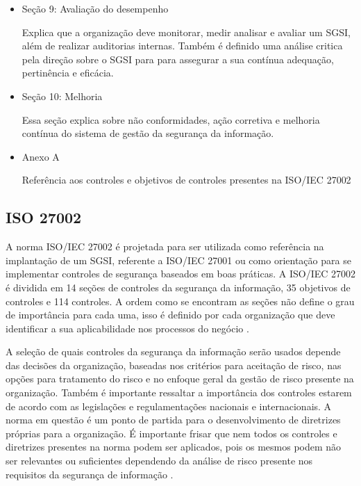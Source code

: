 \begin{itemize}
\item Seção 9: Avaliação do desempenho

    Explica que a organização deve monitorar, medir analisar e avaliar um SGSI, além de realizar auditorias internas. Também é definido uma análise critica pela direção sobre o SGSI para  para assegurar a sua contínua adequação, pertinência e eficácia. 

\item Seção 10: Melhoria
   
    Essa seção explica sobre não conformidades, ação corretiva e melhoria contínua do sistema de gestão
da segurança da informação.

\item Anexo A
   
    Referência aos controles e objetivos de controles presentes na ISO/IEC 27002

 \end{itemize}


\subsection{ISO 27002}

A norma ISO/IEC 27002 é projetada para ser utilizada como referência na implantação de um SGSI, referente a ISO/IEC 27001 ou como orientação para se implementar controles de segurança baseados em boas práticas. A ISO/IEC 27002 é dividida em 14 seções de controles da segurança da informação, 35 objetivos de controles e 114 controles. A ordem como se encontram as seções não define o grau de importância para cada uma, isso é definido por cada organização que deve identificar a sua aplicabilidade nos processos do negócio \cite{ISO27002}.


A seleção de quais controles da segurança da informação serão usados depende das decisões da organização, baseadas nos critérios para aceitação de risco, nas opções para tratamento do risco e no enfoque geral da gestão de risco presente na organização. Também é importante ressaltar a importância dos controles estarem de acordo com as legislações e regulamentações nacionais e internacionais. A norma em questão é um ponto de partida para o desenvolvimento de diretrizes próprias para a organização. É importante frisar que nem todos os controles e diretrizes presentes na norma podem ser aplicados, pois os mesmos podem não ser relevantes ou suficientes dependendo da análise de risco presente nos requisitos da segurança de informação \cite{ISO27002} .

